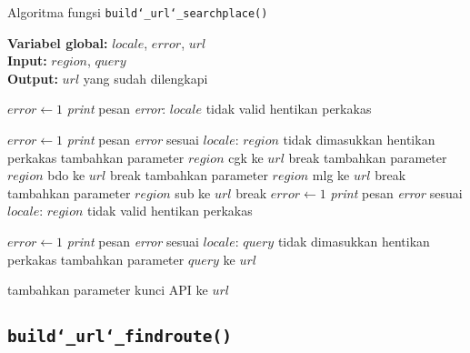 \begin{algorithm}[h]
	\caption{Algoritma fungsi \texttt{build\char`_url\char`_searchplace()}}
	\label{alg:design-buildurl-searchplace}
	\vspace{-0.6\baselineskip}
	\begin{flushleft}
		\textbf{Variabel global:} $locale$, $error$, $url$ \\
        \textbf{Input:} $region$, $query$ \\
        \textbf{Output:} $url$ yang sudah dilengkapi \\
	\end{flushleft}
	\vspace{-1.05\baselineskip}
	\begin{algorithmic}
		    \State $error \gets 1$
			\State \textit{print} pesan \textit{error}: $locale$ tidak valid
			\State hentikan perkakas
		\EndIf
		
				\State $error \gets 1$
				\State \textit{print} pesan \textit{error} sesuai $locale$: $region$ tidak dimasukkan
				\State hentikan perkakas
			\EndCase
				\State tambahkan parameter $region$ \textquotesingle\textquotesingle cgk\textquotesingle\textquotesingle\xspace ke $url$
				\State break
			\EndCase
				\State tambahkan parameter $region$ \textquotesingle\textquotesingle bdo\textquotesingle\textquotesingle\xspace ke $url$
				\State break
			\EndCase
				\State tambahkan parameter $region$ \textquotesingle\textquotesingle mlg\textquotesingle\textquotesingle\xspace ke $url$
				\State break
			\EndCase
				\State tambahkan parameter $region$ \textquotesingle\textquotesingle sub\textquotesingle\textquotesingle\xspace ke $url$
				\State break
			\EndCase
			\Default
				\State $error \gets 1$
				\State \textit{print} pesan \textit{error} sesuai $locale$: $region$ tidak valid
				\State hentikan perkakas
			\EndDefault
		\EndSwitch
		
		    \State $error \gets 1$
			\State \textit{print} pesan \textit{error} sesuai $locale$: $query$ tidak dimasukkan
			\State hentikan perkakas
		\Else
			\State tambahkan parameter $query$ ke $url$
		\EndIf
		
		\State tambahkan parameter kunci API ke $url$
	\end{algorithmic}
\end{algorithm}

\subsection{\texttt{build\char`_url\char`_findroute()}}
\label{sec:design-code-buildurl-findroute}

